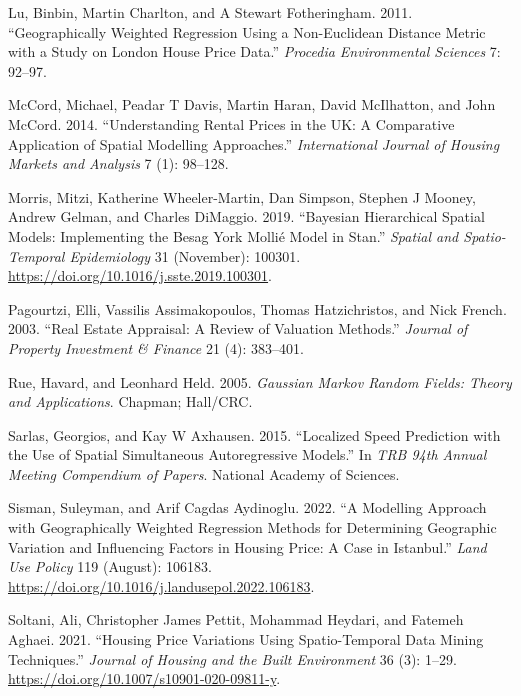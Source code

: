 \documentclass[
  default,
]{sn-jnl}
\newlength{\cslhangindent}
\newenvironment{CSLReferences}[2] %
 {\begin{list}{}{%
  \setlength{\itemindent}{0pt}
  \setlength{\leftmargin}{0pt}
  \setlength{\parsep}{0pt}
  \ifodd #1
   \setlength{\leftmargin}{\cslhangindent}
   \setlength{\itemindent}{-1\cslhangindent}
  \fi
  \setlength{\itemsep}{#2\baselineskip}}}
 {\end{list}}
\begin{document}
\begin{CSLReferences}{1}{0}
Lu, Binbin, Martin Charlton, and A Stewart Fotheringham. 2011.
{``Geographically Weighted Regression Using a Non-Euclidean Distance
Metric with a Study on London House Price Data.''} \emph{Procedia
Environmental Sciences} 7: 92--97.

McCord, Michael, Peadar T Davis, Martin Haran, David McIlhatton, and
John McCord. 2014. {``Understanding Rental Prices in the UK: A
Comparative Application of Spatial Modelling Approaches.''}
\emph{International Journal of Housing Markets and Analysis} 7 (1):
98--128.

Morris, Mitzi, Katherine Wheeler-Martin, Dan Simpson, Stephen J Mooney,
Andrew Gelman, and Charles DiMaggio. 2019. {``Bayesian Hierarchical
Spatial Models: Implementing the Besag York Molli{é} Model in Stan.''}
\emph{Spatial and Spatio-Temporal Epidemiology} 31 (November): 100301.
\url{https://doi.org/10.1016/j.sste.2019.100301}.

Pagourtzi, Elli, Vassilis Assimakopoulos, Thomas Hatzichristos, and Nick
French. 2003. {``Real Estate Appraisal: A Review of Valuation
Methods.''} \emph{Journal of Property Investment \& Finance} 21 (4):
383--401.

Rue, Havard, and Leonhard Held. 2005. \emph{Gaussian Markov Random
Fields: Theory and Applications}. Chapman; Hall/CRC.

Sarlas, Georgios, and Kay W Axhausen. 2015. {``Localized Speed
Prediction with the Use of Spatial Simultaneous Autoregressive
Models.''} In \emph{TRB 94th Annual Meeting Compendium of Papers}.
National Academy of Sciences.

Sisman, Suleyman, and Arif Cagdas Aydinoglu. 2022. {``A Modelling
Approach with Geographically Weighted Regression Methods for Determining
Geographic Variation and Influencing Factors in Housing Price: A Case in
Istanbul.''} \emph{Land Use Policy} 119 (August): 106183.
\url{https://doi.org/10.1016/j.landusepol.2022.106183}.

Soltani, Ali, Christopher James Pettit, Mohammad Heydari, and Fatemeh
Aghaei. 2021. {``Housing Price Variations Using Spatio-Temporal Data
Mining Techniques.''} \emph{Journal of Housing and the Built
Environment} 36 (3): 1--29.
\url{https://doi.org/10.1007/s10901-020-09811-y}.


\end{CSLReferences}
\end{document}
